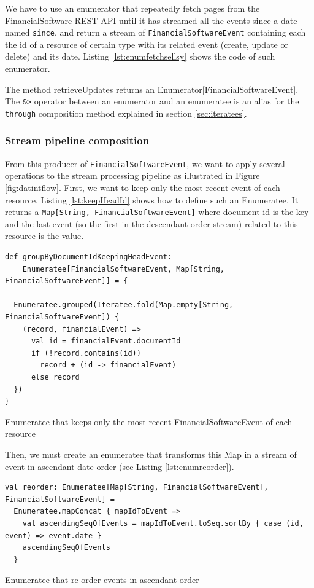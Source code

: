 We have to use an enumerator that repeatedly fetch pages from the FinancialSoftware REST API until it has streamed all the events since a date named \verb|since|, and return
a stream of \verb|FinancialSoftwareEvent| containing each the id of a resource of certain type with its related event (create, update or delete) and its date. 
Listing \ref{lst:enumfetchsellsy} shows the code of such enumerator.

The method retrieveUpdates returns an Enumerator[FinancialSoftwareEvent]. The \verb|&>| operator between an enumerator and an enumeratee
is an alias for the \verb|through| composition method explained in section \ref{sec:iteratees}.

\subsubsection{Stream pipeline composition}

From this producer of \verb|FinancialSoftwareEvent|, we want to apply several operations to the stream processing pipeline as illustrated in Figure \ref{fig:datintflow}. 
First, we want to keep only the most recent event of each resource. Listing \ref{lst:keepHeadId} shows how to define such an Enumeratee. It returns a 
\verb|Map[String, FinancialSoftwareEvent]| where document id is the key and the last event (so the first in the descendant order stream) related to this resource is the value.

\begin{listing}[h]
\begin{verbatim}
def groupByDocumentIdKeepingHeadEvent: 
    Enumeratee[FinancialSoftwareEvent, Map[String, FinancialSoftwareEvent]] = {

  Enumeratee.grouped(Iteratee.fold(Map.empty[String, FinancialSoftwareEvent]) { 
    (record, financialEvent) =>
      val id = financialEvent.documentId
      if (!record.contains(id))
        record + (id -> financialEvent)
      else record
  })
}
\end{verbatim}
\caption{Enumeratee that keeps only the most recent FinancialSoftwareEvent of each resource}
\label{lst:keepHeadId}
\end{listing}

Then, we must create an enumeratee that transforms this Map in a stream of event in ascendant date order (see Listing \ref{lst:enumreorder}).

\begin{listing}[h]
\begin{verbatim}
val reorder: Enumeratee[Map[String, FinancialSoftwareEvent], FinancialSoftwareEvent] = 
  Enumeratee.mapConcat { mapIdToEvent => 
    val ascendingSeqOfEvents = mapIdToEvent.toSeq.sortBy { case (id, event) => event.date }
    ascendingSeqOfEvents
  }
\end{verbatim}
\caption{Enumeratee that re-order events in ascendant order}
\label{lst:enumreorder}
\end{listing}

